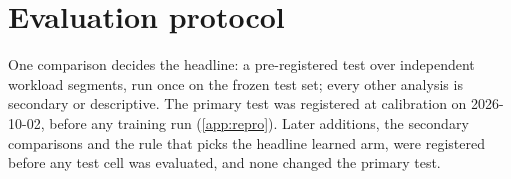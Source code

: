 %

\section{Evaluation protocol}
\label{sec:eval}

One comparison decides the headline: a pre-registered test over independent workload segments, run
once on the frozen test set; every other analysis is secondary or descriptive. The primary test was
registered at calibration on 2026-10-02, before any training run (\cref{app:repro}).
Later additions, the secondary comparisons and the rule that picks the headline learned arm, were
registered before any test cell was evaluated, and none changed the primary test.

